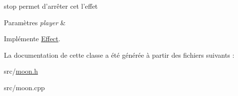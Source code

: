 stop permet d'arrêter cet l'effet 


\begin{DoxyParams}{Paramètres}
{\em player} & \\
\hline
\end{DoxyParams}


Implémente \hyperlink{class_effect_ac8b826d884bfdfc41a2286bcbb4c7dab}{Effect}.



La documentation de cette classe a été générée à partir des fichiers suivants \+:\begin{DoxyCompactItemize}
\item 
src/\hyperlink{moon_8h}{moon.\+h}\item 
src/moon.\+cpp\end{DoxyCompactItemize}
